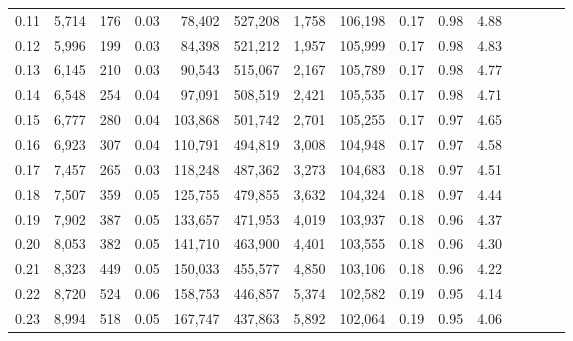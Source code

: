 \begin{tabular}{rrrcrrrrrrrrrrr}
0.11 &   5,714 &    176 &                                       0.03 &   78,402 &  527,208 &    1,758 &  106,198 &  0.17 &  0.98 &                         4.88 \\
0.12 &   5,996 &    199 &                                       0.03 &   84,398 &  521,212 &    1,957 &  105,999 &  0.17 &  0.98 &                         4.83 \\
0.13 &   6,145 &    210 &                                       0.03 &   90,543 &  515,067 &    2,167 &  105,789 &  0.17 &  0.98 &                         4.77 \\
0.14 &   6,548 &    254 &                                       0.04 &   97,091 &  508,519 &    2,421 &  105,535 &  0.17 &  0.98 &                         4.71 \\
0.15 &   6,777 &    280 &                                       0.04 &  103,868 &  501,742 &    2,701 &  105,255 &  0.17 &  0.97 &                         4.65 \\
0.16 &   6,923 &    307 &                                       0.04 &  110,791 &  494,819 &    3,008 &  104,948 &  0.17 &  0.97 &                         4.58 \\
0.17 &   7,457 &    265 &                                       0.03 &  118,248 &  487,362 &    3,273 &  104,683 &  0.18 &  0.97 &                         4.51 \\
0.18 &   7,507 &    359 &                                       0.05 &  125,755 &  479,855 &    3,632 &  104,324 &  0.18 &  0.97 &                         4.44 \\
0.19 &   7,902 &    387 &                                       0.05 &  133,657 &  471,953 &    4,019 &  103,937 &  0.18 &  0.96 &                         4.37 \\
0.20 &   8,053 &    382 &                                       0.05 &  141,710 &  463,900 &    4,401 &  103,555 &  0.18 &  0.96 &                         4.30 \\
0.21 &   8,323 &    449 &                                       0.05 &  150,033 &  455,577 &    4,850 &  103,106 &  0.18 &  0.96 &                         4.22 \\
0.22 &   8,720 &    524 &                                       0.06 &  158,753 &  446,857 &    5,374 &  102,582 &  0.19 &  0.95 &                         4.14 \\
0.23 &   8,994 &    518 &                                       0.05 &  167,747 &  437,863 &    5,892 &  102,064 &  0.19 &  0.95 &                         4.06 \\

\end{tabular}
